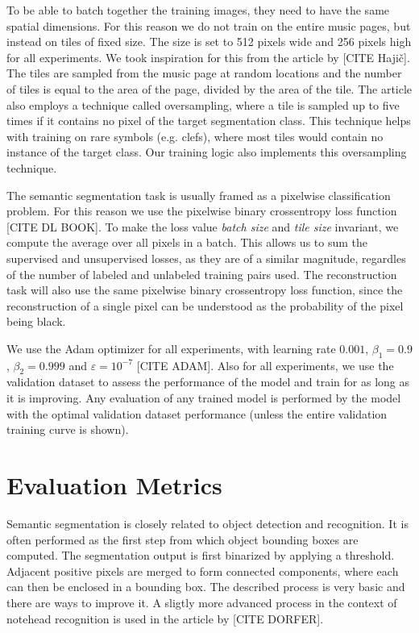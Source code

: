 To be able to batch together the training images, they need to have the same spatial dimensions. For this reason we do not train on the entire music pages, but instead on tiles of fixed size. The size is set to 512 pixels wide and 256 pixels high for all experiments. We took inspiration for this from the article by [CITE Hajič]. The tiles are sampled from the music page at random locations and the number of tiles is equal to the area of the page, divided by the area of the tile. The article also employs a technique called oversampling, where a tile is sampled up to five times if it contains no pixel of the target segmentation class. This technique helps with training on rare symbols (e.g. clefs), where most tiles would contain no instance of the target class. Our training logic also implements this oversampling technique.

The semantic segmentation task is usually framed as a pixelwise classification problem. For this reason we use the pixelwise binary crossentropy loss function [CITE DL BOOK]. To make the loss value \emph{batch size} and \emph{tile size} invariant, we compute the average over all pixels in a batch. This allows us to sum the supervised and unsupervised losses, as they are of a similar magnitude, regardles of the number of labeled and unlabeled training pairs used. The reconstruction task will also use the same pixelwise binary crossentropy loss function, since the reconstruction of a single pixel can be understood as the probability of the pixel being black.

We use the Adam optimizer for all experiments, with learning rate $0.001$, $\beta_1 = 0.9$, $\beta_2 = 0.999$ and $\varepsilon = 10^{-7}$ [CITE ADAM]. Also for all experiments, we use the validation dataset to assess the performance of the model and train for as long as it is improving. Any evaluation of any trained model is performed by the model with the optimal validation dataset performance (unless the entire validation training curve is shown).


\section{Evaluation Metrics}
\label{sec:EvaluationMetrics}

Semantic segmentation is closely related to object detection and recognition. It is often performed as the first step from which object bounding boxes are computed. The segmentation output is first binarized by applying a threshold. Adjacent positive pixels are merged to form connected components, where each can then be enclosed in a bounding box. The described process is very basic and there are ways to improve it. A sligtly more advanced process in the context of notehead recognition is used in the article by [CITE DORFER].

